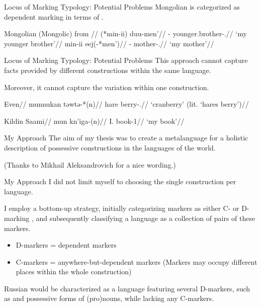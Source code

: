 \documentclass[12pt,aspectratio=169,t]{beamer}
\renewcommand{\'}{\textquotesingle}
\begin{document}
\begin{frame}{Locus of Marking Typology: Potential Problems}
	Mongolian is categorized as dependent marking in terms of \cite{nichols_locus_2013}.
	
	\pex
	\glpreamble Mongolian (Mongolic) from \cite{janhunen_mongolian_2012}//
	\a
	\begingl
	\gla (*min-ii) duu-men'//
	\glb \Fsg-\Gen{} younger.brother-\Poss.\First//
	\glft `my younger brother'//
	\endgl
	\a
	\begingl
	\gla min-ii eej(-*men')//
	\glb \Fsg-\Gen{} mother-\Poss.\First//
	\glft `my mother'//
	\endgl
	\xe
\end{frame}

\begin{frame}{Locus of Marking Typology: Potential Problems}
	This approach cannot capture facts provided by different constructions within the same language.
	
	Moreover, it cannot capture the variation within one construction.
	
	\begin{multicols}{2}
		\ex
		\begingl
		\glpreamble Even//
		\gla munnukan təwtə-*(n)//
		\glb hare berry-\Poss.\Tsg//
		\glft `cranberry' (lit. `hare\'s berry')//
		\endgl
		\xe
		
		\ex
		\begingl
		\glpreamble Kildin Saami//
		\gla mun kn'iga-(n)//
		\glb I.\Gen{} book-\Poss{}1//
		\glft `my book'//
		\endgl
		\xe
		
	\end{multicols}
	
\end{frame}


\begin{frame}{My Approach}
	The aim of my thesis was to create a metalanguage for a holistic description of possessive constructions in the languages of the world.
	
	\vspace{-0.5cm}
	\hfill {\footnotesize (Thanks to Mikhail Aleksandrovich for a nice wording.)}

	
\end{frame}

\begin{frame}{My Approach}
	I did not limit myself to choosing the single construction per language.
	
	I employ a bottom-up strategy, initially categorizing markers as either C- or D-marking \citep{lander2020head}, and subsequently classifying a language as a collection of pairs of these markers.
	
	\begin{itemize}
		\item D-markers = dependent markers
		\item C-markers = anywhere-but-dependent markers (Markers may occupy different places within the whole construction)
	\end{itemize}
	
	 Russian would be characterized as a language featuring several D-markers, such as \Gen{} and possessive forms of (pro)nouns, while lacking any C-markers.
	 
\end{frame}
\end{document}
